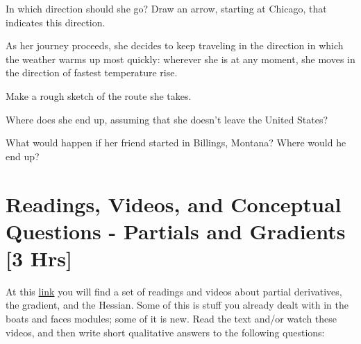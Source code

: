 \documentclass[M3_Night4_Solutions]{subfiles}
\begin{document}
\be[series=exercises, label=\textbf{Exercise} (\arabic*)]
\item In which direction should she go? Draw an arrow, starting at Chicago, that indicates this direction. 
\ee 

As her journey proceeds,  she decides to keep traveling in the direction in which the 
weather warms up most quickly: wherever she is at any moment, she moves in the 
direction of fastest temperature rise.  

\be[resume=exercises, label=\textbf{Exercise} (\arabic*)]
\item Make a rough sketch of the route she takes.  
\item Where does she end up, assuming that she doesn't leave the United States?  
\item What would happen if her friend started in Billings, Montana?  Where would he end up? 


\ee

\section{Readings, Videos, and Conceptual Questions - Partials and Gradients [3 Hrs]}

At this \href{https://sites.google.com/site/linearity2fall2014/partial-derivative-videos}{link} you will find a set of readings and videos about partial derivatives, the gradient, and the Hessian.  Some of this is stuff you already dealt with in the boats and faces modules; some of it is new.
Read the text and/or watch these videos, and then write short qualitative answers to the following questions: 
\end{document}
